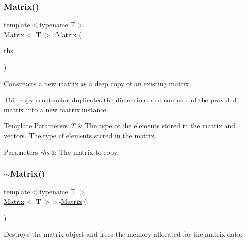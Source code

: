 \subsubsection{\texorpdfstring{Matrix()}{Matrix()}\hspace{0.1cm}{\footnotesize\ttfamily [7/7]}}
{\footnotesize\ttfamily template$<$typename T$>$ \\
\mbox{\hyperlink{classMatrix}{Matrix}}$<$ T $>$\+::\mbox{\hyperlink{classMatrix}{Matrix}} (\begin{DoxyParamCaption}\item[{const \mbox{\hyperlink{classMatrix}{Matrix}}$<$ T $>$ \&}]{rhs }\end{DoxyParamCaption})}



Constructs a new matrix as a deep copy of an existing matrix. 

This copy constructor duplicates the dimensions and contents of the provided matrix into a new matrix instance.


\begin{DoxyTemplParams}{Template Parameters}
{\em T} & The type of the elements stored in the matrix and vectors. The type of elements stored in the matrix. \\
\hline
\end{DoxyTemplParams}

\begin{DoxyParams}{Parameters}
{\em rhs} & The matrix to copy. \\
\hline
\end{DoxyParams}
\mbox{\label{classMatrix_a91aa704de674203e96aece9e1955ccd3}} 
\subsubsection{\texorpdfstring{$\sim$\+Matrix()}{~Matrix()}}
{\footnotesize\ttfamily template$<$typename T $>$ \\
\mbox{\hyperlink{classMatrix}{Matrix}}$<$ T $>$\+::$\sim$\mbox{\hyperlink{classMatrix}{Matrix}} (\begin{DoxyParamCaption}{ }\end{DoxyParamCaption})}



Destroys the matrix object and frees the memory allocated for the matrix data. 



